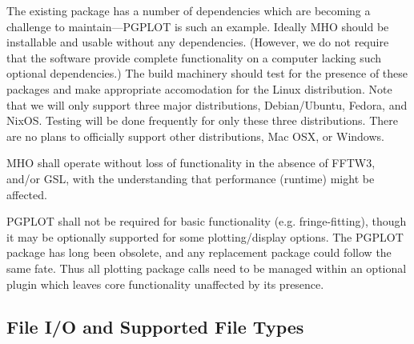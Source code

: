The existing package has a number of dependencies which are becoming
a challenge to maintain---\acs{PGPLOT} is such an example.  Ideally
\acs{MHO} should be installable and usable without any dependencies.
(However, we do not require that the software provide complete functionality
on a computer lacking such optional dependencies.) The build machinery should test
for the presence of these packages and make appropriate accomodation for
the Linux distribution. Note that we will only support three major distributions,
Debian/Ubuntu, Fedora, and NixOS. Testing will be done frequently for only these
three distributions. There are no plans to officially support other distributions,
Mac OSX, or Windows.

\begin{description}

  MHO shall operate without loss of functionality in the absence of
FFTW3, and/or GSL, with the understanding that performance (runtime) might be
affected. 

 \acs{PGPLOT} shall not be required for basic functionality (e.g. fringe-fitting),
though it may be optionally supported for some plotting/display options.
The \acs{PGPLOT} package has long been obsolete, and any replacement package
could follow the same fate. Thus all plotting package calls need to be managed
within an optional plugin which leaves core functionality unaffected by its presence.

\end{description}





\subsection{File I/O and Supported File Types}
\label{sec:ioreq}

